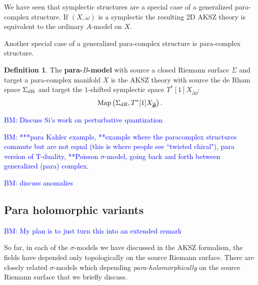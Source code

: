 \documentclass{article}
\newcommand{\p}{\partial}
\newcommand{\pd}{\overline{\p\!\!\!\p}}
\theoremstyle{definition}
\newtheorem{Def}[theorem]{Definition}
\theoremstyle{remark}
\def\brian{\textcolor{blue}{BM: }\textcolor{blue}}
\begin{document}
We have seen that symplectic structures are a special case of a generalized para-complex structure. 
If $(X, \omega)$ is a symplectic the resulting 2D AKSZ theory is equivalent to the ordinary $A$-model on $X$. 

Another special case of a generalized para-complex structure is para-complex structure.

\begin{Def}
The {\bf para-$B$-model} with source a closed Riemann surface $\Sigma$ and target a para-complex manifold $X$ is the AKSZ theory with source the de Rham space $\Sigma_{\rm dR}$ and target the $1$-shifted symplectic space $T^*[1] X_{\pd}$:
\[
{\rm Map}\left(\Sigma_{dR}, T^*[1]  X_{\pd}\right) .
\]
\end{Def}

\brian{Discuss Si's work on perturbative quantization}

\hrulefill

\brian{***para Kahler example, **example where the paracomplex structures commute but are not equal (this is where people see ``twisted chiral"), para version of T-duality, **Poisson $\sigma$-model, going back and forth between generalized (para) complex.
}  

 \brian{discuss anomalies}

\subsection{Para holomorphic variants}

\brian{My plan is to just turn this into an extended remark}

So far, in each of the $\sigma$-models we have discussed in the AKSZ formalism, the fields have depended only topologically on the source Riemann surface. 
There are closely related $\sigma$-models which depending {\em para-holomorphically} on the source Riemann surface that we briefly discuss. 
\end{document}
